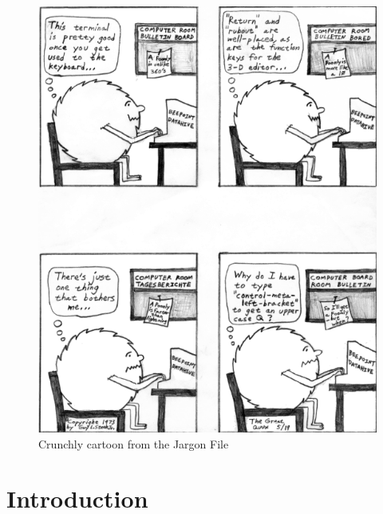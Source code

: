 \documentclass[11pt]{article}
\begin{document}
\begin{figure}
\includegraphics[width=4.5in]{73-05-19.png}
\caption{Crunchly cartoon from the Jargon File}
\end{figure}

\newpage

\tableofcontents

\newpage
{}
\setcounter{page}{1}
\section{Introduction}
\end{document}
